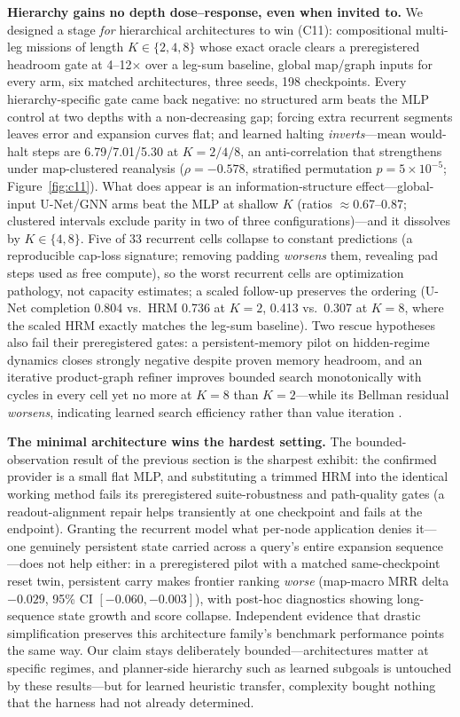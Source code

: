 \documentclass[letterpaper]{article} %
\newcommand{\stage}[1]{\textsc{#1}}
\begin{document}
\textbf{Hierarchy gains no depth dose--response, even when invited to.} We designed a stage \emph{for} hierarchical architectures to win (\stage{C11}): compositional multi-leg missions of length $K\in\{2,4,8\}$ whose exact oracle clears a preregistered headroom gate at 4--12$\times$ over a leg-sum baseline, global map/graph inputs for every arm, six matched architectures, three seeds, 198 checkpoints. Every hierarchy-specific gate came back negative: no structured arm beats the MLP control at two depths with a non-decreasing gap; forcing extra recurrent segments leaves error and expansion curves flat; and learned halting \emph{inverts}---mean would-halt steps are 6.79/7.01/5.30 at $K{=}2/4/8$, an anti-correlation that strengthens under map-clustered reanalysis ($\rho{=}-0.578$, stratified permutation $p{=}5{\times}10^{-5}$; Figure~\ref{fig:c11}). What does appear is an information-structure effect---global-input U-Net/GNN arms beat the MLP at shallow $K$ (ratios $\approx$0.67--0.87; clustered intervals exclude parity in two of three configurations)---and it dissolves by $K\in\{4,8\}$. Five of 33 recurrent cells collapse to constant predictions (a reproducible cap-loss signature; removing padding \emph{worsens} them, revealing pad steps used as free compute), so the worst recurrent cells are optimization pathology, not capacity estimates; a scaled follow-up preserves the ordering (U-Net completion 0.804 vs.\ HRM 0.736 at $K{=}2$, 0.413 vs.\ 0.307 at $K{=}8$, where the scaled HRM exactly matches the leg-sum baseline). Two rescue hypotheses also fail their preregistered gates: a persistent-memory pilot on hidden-regime dynamics closes strongly negative despite proven memory headroom, and an iterative product-graph refiner improves bounded search monotonically with cycles in every cell yet no more at $K{=}8$ than $K{=}2$---while its Bellman residual \emph{worsens}, indicating learned search efficiency rather than value iteration \citep{tamar2016vin,lee2018gppn}.

\textbf{The minimal architecture wins the hardest setting.} The bounded-observation result of the previous section is the sharpest exhibit: the confirmed provider is a small flat MLP, and substituting a trimmed HRM into the identical working method fails its preregistered suite-robustness and path-quality gates (a readout-alignment repair helps transiently at one checkpoint and fails at the endpoint). Granting the recurrent model what per-node application denies it---one genuinely persistent state carried across a query's entire expansion sequence---does not help either: in a preregistered pilot with a matched same-checkpoint reset twin, persistent carry makes frontier ranking \emph{worse} (map-macro MRR delta $-0.029$, 95\% CI $[-0.060,-0.003]$), with post-hoc diagnostics showing long-sequence state growth and score collapse. Independent evidence that drastic simplification preserves this architecture family's benchmark performance \citep{jolicoeur2025trm} points the same way. Our claim stays deliberately bounded---architectures matter at specific regimes, and planner-side hierarchy such as learned subgoals \citep{czechowski2021subgoal} is untouched by these results---but for learned heuristic transfer, complexity bought nothing that the harness had not already determined.
\end{document}
